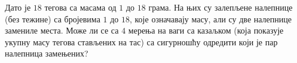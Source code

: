 \problem
Дато је $18$ тегова са масама од $1$ до $18$ грама.
На њих су залепљене налепнице (без тежине) са бројевима $1$ до $18$, које
означавају масу, али су две налепнице замениле места.
Може ли се са $4$ мерења на ваги са казаљком (која показује укупну масу тегова
стављених на тас) са сигурношћу одредити који је пар налепница замењених?

\solution

\endproblem
